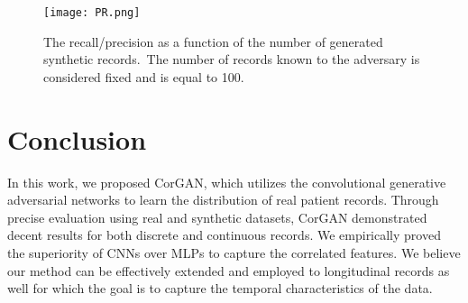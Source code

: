 \documentclass[letterpaper]{article} \usepackage{aaai20}  \usepackage{times}  \usepackage{helvet} \usepackage{courier}  \usepackage[hyphens]{url}  \usepackage{graphicx} \urlstyle{rm} \def\UrlFont{\rm}  \usepackage{graphicx}  \frenchspacing  \setlength{\pdfpagewidth}{8.5in}  \setlength{\pdfpageheight}{11in}
\begin{document}
\begin{figure}
\centering
    \texttt{[image: PR.png]}
    \caption[]{The recall/precision as a function of the number of generated
synthetic records.~The number of records known to the adversary is considered fixed and is equal to 100.} \label{fig:prsyntheticnumber}
\end{figure}






\section{Conclusion}\label{sec:Conclusion}

In this work, we proposed CorGAN, which utilizes the convolutional generative adversarial networks to learn the distribution of real patient records. Through precise evaluation using real and synthetic datasets, CorGAN demonstrated decent results for both discrete and continuous records.  We empirically proved the superiority of CNNs over MLPs to capture the correlated features. We believe our method can be effectively extended and employed to longitudinal records as well for which the goal is to capture the temporal characteristics of the data.



\end{document}
